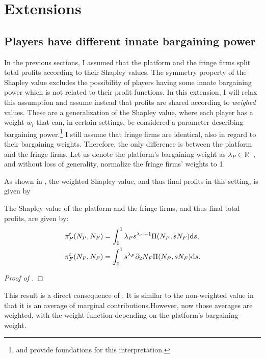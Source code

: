 \section{Extensions}
\label{sec:application_extensions}

\subsection{Players have different innate bargaining power}
\label{sec:higher_bargaining_power}

In the previous sections, I assumed that the platform and the fringe firms split total profits according to their Shapley values.
The symmetry property of the Shapley value excludes the possibility of players having some innate bargaining power which is not related to their profit functions.
In this extension, I will relax this assumption and assume instead that profits are shared according to \emph{weighed} values.
These are a generalization of the Shapley value, where each player has a weight $w_i$ that can, in certain settings, be considered a parameter describing bargaining power.\footnote{
    \textcite{hart1996bargaining} and \textcite{stole1996intra} provide foundations for this interpretation.
}
I still assume that fringe firms are identical, also in regard to their bargaining weights.
Therefore, the only difference is between the platform and the fringe firms.
Let us denote the platform's bargaining weight as $\lambda_P \in \mathbb{R}^+$, and without loss of generality, normalize the fringe firms' weights to 1.

As shown in , the weighted Shapley value, and thus final profits in this setting, is given by
\begin{proposition}
    \label{prop:weighted_shapley_value}
    The Shapley value of the platform and the fringe firms, and thus final total profits, are given by:
    \begin{align*}
        \pi^t_P(N_P, N_F) &= \int_0^1 \lambda_P s ^ {\lambda_P - 1} \Pi(N_P,s N_F) \mathrm{d}s, \\
        \pi^t_F(N_P, N_F) &= \int_0^1 s ^ {\lambda_P} \partial_2 N_F \Pi(N_P,s N_F) \mathrm{d}s.
    \end{align*}
\end{proposition}
\begin{proof}[Proof of ]
\end{proof}
This result is a direct consequence of .
It is similar to the non-weighted value in that it is an average of marginal contributions.However, now those averages are weighted, with the weight function depending on the platform's bargaining weight.

